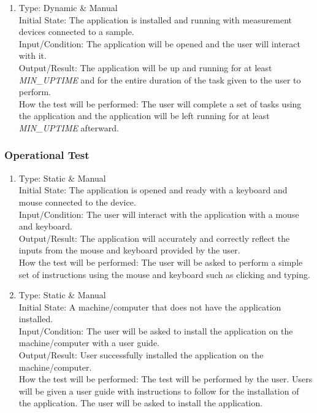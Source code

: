 \documentclass[12pt, titlepage]{article}
\begin{document}
\begin{adjustwidth}{2.2em}{0pt}
\begin{enumerate}[{NF-PT}1.]
  \item Type: Dynamic \& Manual\\ \label{PT4}
  Initial State: The application is installed and running with measurement devices connected to a sample.\\
  Input/Condition: The application will be opened and the user will interact with it.\\
  Output/Result: The application will be up and running for at least \textsl{MIN\_UPTIME} and for the entire duration of the task given to the user to perform.\\
  How the test will be performed: The user will complete a set of tasks using the application and the application will be left running for at least \textsl{MIN\_UPTIME} afterward.

\end{enumerate}
\end{adjustwidth}

\subsubsection{Operational Test}

\begin{adjustwidth}{2.2em}{0pt}
\begin{enumerate}[{NF-OT}1.]
    \item Type: Static \& Manual\\ \label{OT1}
    Initial State: The application is opened and ready with a keyboard and mouse connected to the device.\\
    Input/Condition: The user will interact with the application with a mouse and keyboard.\\
    Output/Result: The application will accurately and correctly reflect the inputs from the mouse and keyboard provided by the user.\\
    How the test will be performed: The user will be asked to perform a simple set of instructions using the mouse and keyboard such as clicking and typing.
    
    \item Type: Static \& Manual\\ \label{OT2}
    Initial State: A machine/computer that does not have the application installed.\\
    Input/Condition: The user will be asked to install the application on the machine/computer with a user guide.\\
    Output/Result: User successfully installed the application on the machine/computer.\\
    How the test will be performed: The test will be performed by the user. Users will be given a user guide with instructions to follow for the installation of the application. The user will be asked to install the application.
\end{enumerate}
\end{adjustwidth}
\end{document}
